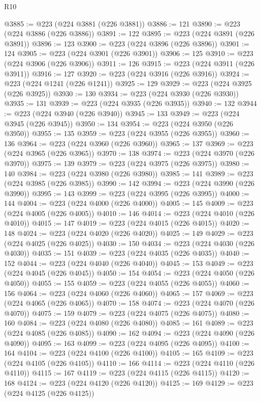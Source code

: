 \begin{lexlean}{R10}
\begin{coremodule}
{{{{{{{{{{{{{{{{{{{{{{{{{{{{{{{{{{{{{{{{{{{{{{{{{{{{{{{{{{{{{{{{{{{{{{{{{{{{{{{{{{{{@3885 := @223 (@224 @3881 (@226 @3881))
@3886 := 121
@3890 := @223 (@224 @3886 (@226 @3886))
@3891 := 122
@3895 := @223 (@224 @3891 (@226 @3891))
@3896 := 123
@3900 := @223 (@224 @3896 (@226 @3896))
@3901 := 124
@3905 := @223 (@224 @3901 (@226 @3901))
@3906 := 125
@3910 := @223 (@224 @3906 (@226 @3906))
@3911 := 126
@3915 := @223 (@224 @3911 (@226 @3911))
@3916 := 127
@3920 := @223 (@224 @3916 (@226 @3916))
@3924 := @223 (@224 @1241 (@226 @1241))
@3925 := 129
@3929 := @223 (@224 @3925 (@226 @3925))
@3930 := 130
@3934 := @223 (@224 @3930 (@226 @3930))
@3935 := 131
@3939 := @223 (@224 @3935 (@226 @3935))
@3940 := 132
@3944 := @223 (@224 @3940 (@226 @3940))
@3945 := 133
@3949 := @223 (@224 @3945 (@226 @3945))
@3950 := 134
@3954 := @223 (@224 @3950 (@226 @3950))
@3955 := 135
@3959 := @223 (@224 @3955 (@226 @3955))
@3960 := 136
@3964 := @223 (@224 @3960 (@226 @3960))
@3965 := 137
@3969 := @223 (@224 @3965 (@226 @3965))
@3970 := 138
@3974 := @223 (@224 @3970 (@226 @3970))
@3975 := 139
@3979 := @223 (@224 @3975 (@226 @3975))
@3980 := 140
@3984 := @223 (@224 @3980 (@226 @3980))
@3985 := 141
@3989 := @223 (@224 @3985 (@226 @3985))
@3990 := 142
@3994 := @223 (@224 @3990 (@226 @3990))
@3995 := 143
@3999 := @223 (@224 @3995 (@226 @3995))
@4000 := 144
@4004 := @223 (@224 @4000 (@226 @4000))
@4005 := 145
@4009 := @223 (@224 @4005 (@226 @4005))
@4010 := 146
@4014 := @223 (@224 @4010 (@226 @4010))
@4015 := 147
@4019 := @223 (@224 @4015 (@226 @4015))
@4020 := 148
@4024 := @223 (@224 @4020 (@226 @4020))
@4025 := 149
@4029 := @223 (@224 @4025 (@226 @4025))
@4030 := 150
@4034 := @223 (@224 @4030 (@226 @4030))
@4035 := 151
@4039 := @223 (@224 @4035 (@226 @4035))
@4040 := 152
@4044 := @223 (@224 @4040 (@226 @4040))
@4045 := 153
@4049 := @223 (@224 @4045 (@226 @4045))
@4050 := 154
@4054 := @223 (@224 @4050 (@226 @4050))
@4055 := 155
@4059 := @223 (@224 @4055 (@226 @4055))
@4060 := 156
@4064 := @223 (@224 @4060 (@226 @4060))
@4065 := 157
@4069 := @223 (@224 @4065 (@226 @4065))
@4070 := 158
@4074 := @223 (@224 @4070 (@226 @4070))
@4075 := 159
@4079 := @223 (@224 @4075 (@226 @4075))
@4080 := 160
@4084 := @223 (@224 @4080 (@226 @4080))
@4085 := 161
@4089 := @223 (@224 @4085 (@226 @4085))
@4090 := 162
@4094 := @223 (@224 @4090 (@226 @4090))
@4095 := 163
@4099 := @223 (@224 @4095 (@226 @4095))
@4100 := 164
@4104 := @223 (@224 @4100 (@226 @4100))
@4105 := 165
@4109 := @223 (@224 @4105 (@226 @4105))
@4110 := 166
@4114 := @223 (@224 @4110 (@226 @4110))
@4115 := 167
@4119 := @223 (@224 @4115 (@226 @4115))
@4120 := 168
@4124 := @223 (@224 @4120 (@226 @4120))
@4125 := 169
@4129 := @223 (@224 @4125 (@226 @4125))
}}}}}}}}}}}}}}}}}}}}}}}}}}}}}}}}}}}}}}}}}}}}}}}}}}}}}}}}}}}}}}}}}}}}}}}}}}}}}}}}}}}}
\end{coremodule}
\end{lexlean}
